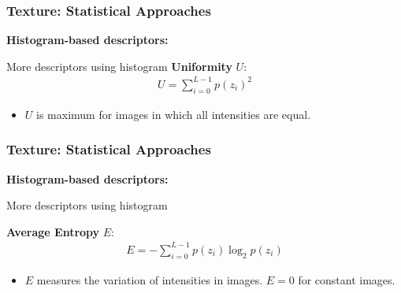 \documentclass[english,11pt,table,handout]{beamer}
\begin{document}
{
	\frametitle{Texture: Statistical Approaches}
	\large
	\textbf{Histogram-based descriptors: }
	\newline
	
	\begin{block}{More descriptors using histogram }
		\textbf{Uniformity} $U$:
			\begin{equation}
				\begin{split}
				\nonumber
				U = \sum_{i=0}^{L-1}{p(z_i)^2}
				\end{split}
			\end{equation}
			\begin{itemize}
				\item $U$ is maximum for images in which all intensities are equal. 
			\end{itemize}
	
	\end{block}
	
}

\frame
{
	\frametitle{Texture: Statistical Approaches}
	\large
	\textbf{Histogram-based descriptors: }
	\newline
	
	\begin{block}{More descriptors using histogram }

		\textbf{Average Entropy} $E$:
		\begin{equation}
		\begin{split}
		\nonumber
		E = -\sum_{i=0}^{L-1}{p(z_i)\log_{2}{p(z_i)}}
		\end{split}
		\end{equation}
		\begin{itemize}
			\item $E$ measures the variation of intensities in images. $E = 0$ for constant images. 
		\end{itemize}
	\end{block}
	
}
\end{document}
